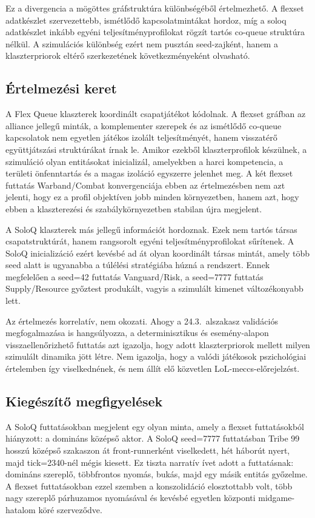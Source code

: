 ﻿\documentclass[a4paper,12pt]{report}
\begin{document}
Ez a divergencia a mögöttes gráfstruktúra különbségéből értelmezhető. A flexset adatkészlet szervezettebb, ismétlődő kapcsolatmintákat hordoz, míg a soloq adatkészlet inkább egyéni teljesítményprofilokat rögzít tartós co-queue struktúra nélkül. A szimulációs különbség ezért nem pusztán seed-zajként, hanem a klaszterpriorok eltérő szerkezetének következményeként olvasható.

\subsection*{Értelmezési keret}

A Flex Queue klaszterek koordinált csapatjátékot kódolnak. A flexset gráfban az alliance jellegű minták, a komplementer szerepek és az ismétlődő co-queue kapcsolatok nem egyetlen játékos izolált teljesítményét, hanem visszatérő együttjátszási struktúrákat írnak le. Amikor ezekből klaszterprofilok készülnek, a szimuláció olyan entitásokat inicializál, amelyekben a harci kompetencia, a területi önfenntartás és a magas izoláció egyszerre jelenhet meg. A két flexset futtatás Warband/Combat konvergenciája ebben az értelmezésben nem azt jelenti, hogy ez a profil objektíven jobb minden környezetben, hanem azt, hogy ebben a klaszterezési és szabálykörnyezetben stabilan újra megjelent.

A SoloQ klaszterek más jellegű információt hordoznak. Ezek nem tartós társas csapatstruktúrát, hanem rangsorolt egyéni teljesítményprofilokat sűrítenek. A SoloQ inicializáció ezért kevésbé ad át olyan koordinált társas mintát, amely több seed alatt is ugyanabba a túlélési stratégiába húzná a rendszert. Ennek megfelelően a seed=42 futtatás Vanguard/Risk, a seed=7777 futtatás Supply/Resource győztest produkált, vagyis a szimulált kimenet változékonyabb lett.

Az értelmezés korrelatív, nem okozati. Ahogy a 24.3.~alszakasz validációs megfogalmazása is hangsúlyozza, a determinisztikus és esemény-alapon visszaellenőrizhető futtatás azt igazolja, hogy adott klaszterpriorok mellett milyen szimulált dinamika jött létre. Nem igazolja, hogy a valódi játékosok pszichológiai értelemben így viselkednének, és nem állít elő közvetlen LoL-meccs-előrejelzést.

\subsection*{Kiegészítő megfigyelések}

A SoloQ futtatásokban megjelent egy olyan minta, amely a flexset futtatásokból hiányzott: a domináns középső aktor. A SoloQ seed=7777 futtatásban Tribe 99 hosszú középső szakaszon át front-runnerként viselkedett, hét háborút nyert, majd tick=2340-nél mégis kiesett. Ez tiszta narratív ívet adott a futtatásnak: domináns szereplő, többfrontos nyomás, bukás, majd egy másik entitás győzelme. A flexset futtatásokban ezzel szemben a konszolidáció elosztottabb volt, több nagy szereplő párhuzamos nyomásával és kevésbé egyetlen központi midgame-hatalom köré szerveződve.
\end{document}
